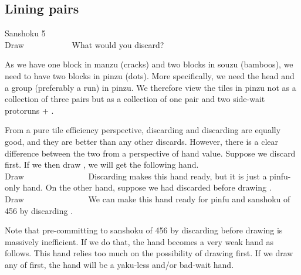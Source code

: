 \newpage
\subsection{Lining pairs}\label{sec:san5}
\begin{itembox}[r]{{\jap Sanshoku} 5}
\bp
{}~\\
\hfill\footnotesize{Draw~~~~~~~~~~~}
\ep
\vspace{-17pt}What would you discard? \vspace{-5pt}
\end{itembox}
\noindent
As we have one block in {\jap manzu} (cracks) and two blocks in {\jap souzu} (bamboos), we need to have two blocks in {\jap pinzu} (dots). More specifically, we need the head and a group (preferably a run) in {\jap pinzu}. 
We therefore view the tiles in {\jap pinzu} not as a collection of three pairs but as a collection of one pair {\LARGE{}} and two side-wait protoruns {\LARGE{}} + {\LARGE{}}. 

\bigskip
From a pure tile efficiency perspective, discarding {\LARGE{}} and discarding {\LARGE{}} are equally good, and they are better than any other discards. However, there is a clear difference between the two from a perspective of hand value. 
Suppose we discard {\LARGE{}} first. If we then draw {\LARGE{}}, we will get the following hand.
\bp
{}~\\
\hfill\footnotesize{Draw~~~~~~~~~~~~~~~}
\ep
Discarding {\LARGE{}} makes this hand ready, but it is just a {\jap pinfu}-only hand. On the other hand, suppose we had discarded {\LARGE{}} before drawing {\LARGE{}}. 
\bp
{}~\\
\hfill\footnotesize{Draw~~~~~~~~~~~~~~~}
\ep
We can make this hand ready for {\jap pinfu} and {\jap sanshoku} of 456 by discarding {\LARGE{}}. 

\bigskip
Note that pre-committing to {\jap sanshoku} of 456 by discarding {\LARGE{}} before drawing {\LARGE{}} is massively inefficient. If we do that, the hand becomes a very weak hand as follows. 
\bp
{}
\ep
This hand relies too much on the possibility of drawing {\LARGE{}} first. If we draw any of {\LARGE{}} first, the hand will be a {\jap yaku}-less and/or bad-wait hand.


